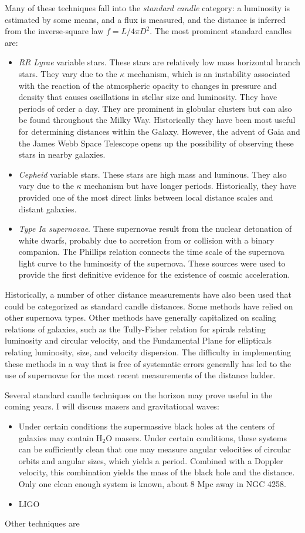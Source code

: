 Many of these techniques fall into the {\it standard candle} category:
a luminosity is estimated by some means, and a flux is measured, and
the distance is inferred from the inverse-square law $f=L/4\pi D^2$.
The most prominent standard candles are:
\begin{itemize}
\item {\it RR Lyrae} variable stars. These stars are relatively low mass
  horizontal branch stars. They vary due to the $\kappa$ mechanism,
  which is an instability associated with the reaction of the
  atmospheric opacity to changes in pressure and density that causes
  oscillations in stellar size and luminosity.  They have periods of
  order a day. They are prominent in globular clusters but can also be
  found throughout the Milky Way. Historically they have been most
  useful for determining distances within the Galaxy. However, the
  advent of Gaia and the James Webb Space Telescope opens up the
  possibility of observing these stars in nearby galaxies.
\item {\it Cepheid} variable stars. These stars are high mass and
  luminous.  They also vary due to the $\kappa$ mechanism but have
  longer periods. Historically, they have provided one of the most
  direct links between local distance scales and distant galaxies.
\item {\it Type Ia supernovae}. These supernovae result from the
  nuclear detonation of white dwarfs, probably due to accretion from
  or collision with a binary companion. The Phillips relation connects
  the time scale of the supernova light curve to the luminosity of the
  supernova. These sources were used to provide the first definitive
  evidence for the existence of cosmic acceleration.
\end{itemize}
Historically, a number of other distance measurements have also been
used that could be categorized as standard candle distances. Some
methods have relied on other supernova types. Other methods have
generally capitalized on scaling relations of galaxies, such as the
Tully-Fisher relation for spirals relating luminosity and circular
velocity, and the Fundamental Plane for ellipticals relating
luminosity, size, and velocity dispersion. The difficulty in
implementing these methods in a way that is free of systematic errors
generally has led to the use of supernovae for the most recent
measurements of the distance ladder.

Several standard candle techniques on the horizon may prove useful in
the coming years. I will discuss masers and gravitational waves:
\begin{itemize}
  \item Under certain conditions the supermassive
black holes at the centers of galaxies may contain H$_2$O
masers. Under certain conditions, these systems can be sufficiently
clean that one may measure angular velocities of circular orbits and
angular sizes, which yields a period. Combined with a Doppler
velocity, this combination yields the mass of the black hole and the
distance. Only one clean enough system is known, about 8 Mpc away in
NGC 4258.
\item LIGO
  \end{itemize}
Other techniques are 

